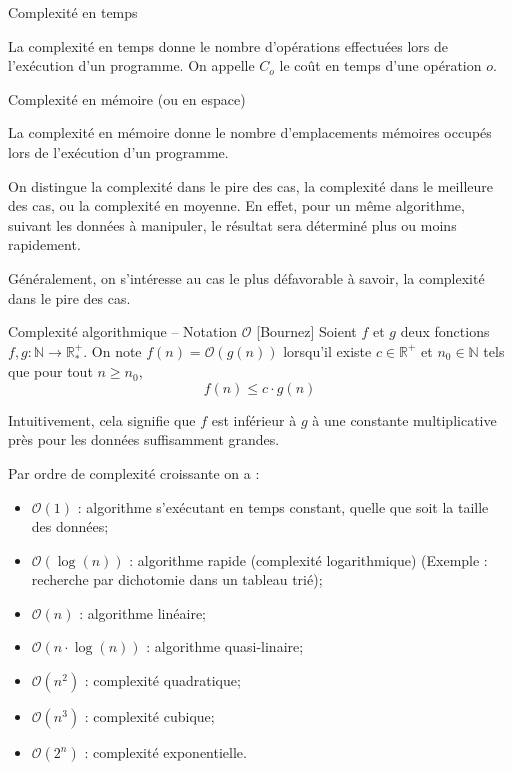 \begin{defi}{Complexité en temps}

La complexité en temps donne le nombre d'opérations effectuées lors de l'exécution d'un programme. On appelle $C_o$ le coût en temps d'une opération $o$.

\end{defi}

\begin{defi}{Complexité en mémoire (ou en espace)}

La complexité en mémoire donne le nombre d'emplacements mémoires occupés lors de l'exécution d'un programme.
\end{defi}

\begin{rem}

On distingue la complexité dans le pire des cas, la complexité dans le meilleure des cas, ou la complexité en moyenne. En effet, pour un même algorithme, suivant les données à manipuler, le résultat sera déterminé plus ou moins rapidement. 

Généralement, on s'intéresse au cas le plus défavorable à savoir, la complexité dans le pire des cas. 
\end{rem}

\begin{defi}{Complexité algorithmique -- Notation $\mathcal{O}$}
 [Bournez]
Soient $f$ et $g$ deux fonctions $f,g : \mathbb{N} \rightarrow \mathbb{R}^{+}_{*}$. On note $f(n)=\mathcal{O}(g(n))$ lorsqu'il existe $c\in\mathbb{R}^+$ et $n_0\in\mathbb{N}$ tels que pour tout $n\geq n_0$, 
$$
f(n) \leq c\cdot g(n)
$$

Intuitivement, cela signifie que $f$ est inférieur à $g$ à une constante multiplicative près pour les données suffisamment grandes. 

\end{defi}

\begin{exemple}
Par ordre de complexité croissante on a :
\begin{itemize}
\item $\mathcal{O}(1)$ : algorithme s'exécutant en temps constant, quelle que soit la taille des données;
\item $\mathcal{O}(\log(n))$ : algorithme rapide (complexité logarithmique) (Exemple : recherche par dichotomie dans un tableau trié);
\item $\mathcal{O}(n)$ : algorithme linéaire;
\item $\mathcal{O}(n\cdot \log(n))$ : algorithme quasi-linaire;
\item $\mathcal{O}(n^2)$ : complexité quadratique;
\item $\mathcal{O}(n^3)$ : complexité cubique;
\item $\mathcal{O}(2^n)$ : complexité exponentielle. 
\end{itemize}
\end{exemple}

